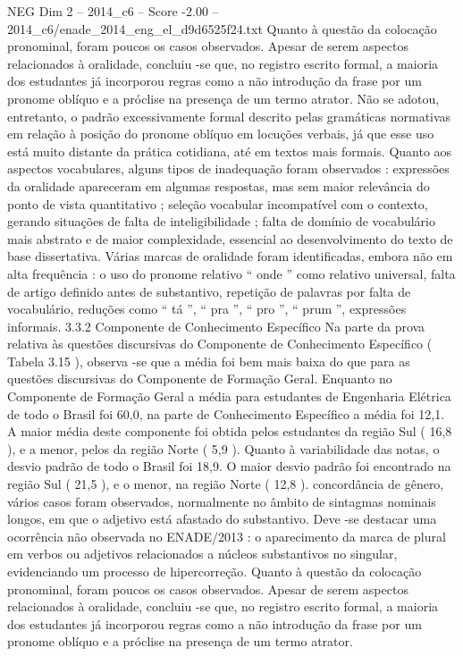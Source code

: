 \begin{textsample}{NEG Dim 2 – 2014\_c6 – Score -2.00 – 2014\_c6/enade\_2014\_eng\_el\_d9d6525f24.txt}
Quanto à questão da colocação pronominal, foram poucos os casos observados.
Apesar de serem aspectos relacionados à oralidade, concluiu -se que, no registro escrito formal, a maioria dos estudantes já incorporou regras como a não introdução da frase por um pronome oblíquo e a próclise na presença de um termo atrator.
Não se adotou, entretanto, o padrão excessivamente formal descrito pelas gramáticas normativas em relação à posição do pronome oblíquo em locuções verbais, já que esse uso está muito distante da prática cotidiana, até em textos mais formais.
Quanto aos aspectos vocabulares, alguns tipos de inadequação foram observados : expressões da oralidade apareceram em algumas respostas, mas sem maior relevância do ponto de vista quantitativo ; seleção vocabular incompatível com o contexto, gerando situações de falta de inteligibilidade ; falta de domínio de vocabulário mais abstrato e de maior complexidade, essencial ao desenvolvimento do texto de base dissertativa.
Várias marcas de oralidade foram identificadas, embora não em alta frequência : o uso do pronome relativo “ onde ” como relativo universal, falta de artigo definido antes de substantivo, repetição de palavras por falta de vocabulário, reduções como “ tá ”, “ pra ”, “ pro ”, “ prum ”, expressões informais. 3.3.2 Componente de Conhecimento Específico Na parte da prova relativa às questões discursivas do Componente de Conhecimento Específico ( Tabela 3.15 ), observa -se que a média foi bem mais baixa do que para as questões discursivas do Componente de Formação Geral.
Enquanto no Componente de Formação Geral a média para estudantes de Engenharia Elétrica de todo o Brasil foi 60,0, na parte de Conhecimento Específico a média foi 12,1.
A maior média deste componente foi obtida pelos estudantes da região Sul ( 16,8 ), e a menor, pelos da região Norte ( 5,9 ).
Quanto à variabilidade das notas, o desvio padrão de todo o Brasil foi 18,9.
O maior desvio padrão foi encontrado na região Sul ( 21,5 ), e o menor, na região Norte ( 12,8 ). concordância de gênero, vários casos foram observados, normalmente no âmbito de sintagmas nominais longos, em que o adjetivo está afastado do substantivo.
Deve -se destacar uma ocorrência não observada no ENADE/2013 : o aparecimento da marca de plural em verbos ou adjetivos relacionados a núcleos substantivos no singular, evidenciando um processo de hipercorreção.
Quanto à questão da colocação pronominal, foram poucos os casos observados.
Apesar de serem aspectos relacionados à oralidade, concluiu -se que, no registro escrito formal, a maioria dos estudantes já incorporou regras como a não introdução da frase por um pronome oblíquo e a próclise na presença de um termo atrator.

\end{textsample}
